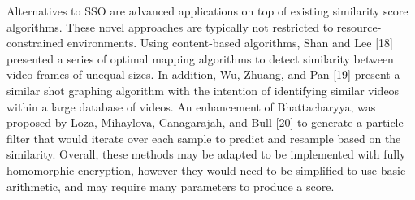 

Alternatives to SSO are advanced applications on top of existing similarity score algorithms. These novel approaches are typically not restricted to resource-constrained environments.
Using content-based algorithms, Shan and Lee [18] presented a series of optimal mapping algorithms to detect similarity between video frames of unequal sizes. In addition, Wu, Zhuang, and Pan [19] present a similar shot graphing algorithm with the intention of identifying similar videos within a large database of videos. An enhancement of Bhattacharyya, was proposed by Loza, Mihaylova, Canagarajah, and Bull [20] to generate a particle filter that would iterate over each sample to predict and resample based on the similarity. Overall, these methods may be adapted to be implemented with fully homomorphic encryption, however they would need to be simplified to use basic arithmetic, and may require many parameters to produce a score.
